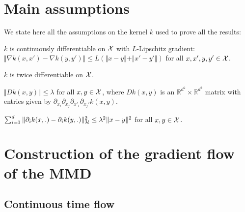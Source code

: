 \section{Main assumptions}\label{sec:assumptions_kernel}

We state here all the assumptions on the kernel $k$ used to prove all the results:%
\begin{assumplist}
	\item \label{assump:lipschitz_gradient_k} $k$ is continuously differentiable on ${{\mathcal X}}$ with $L$-Lipschitz gradient: $\Vert  \nabla k(x,x') - \nabla k(y,y')\Vert \leq L(\Vert  x-y\Vert + \Vert x'-y' \Vert ) $ for all $x,x',y,y' \in {{\mathcal X}}$.
	\item \label{assump:diff_kernel} $k$ is twice differentiable on ${{\mathcal X}}$.
	\item \label{assump:bounded_fourth_oder} $\Vert Dk(x,y) \Vert\leq \lambda  $ for all $x,y\in {{\mathcal X}}$, where $Dk(x,y)$ is an $\mathbb{R}^{d^2}\times \mathbb{R}^{d^2}$ matrix with entries given by $\partial_{x_{i}}\partial_{x_{j}}\partial_{x'_{i}}\partial_{x_{j}'}k(x,y)$.%
	\item \label{assump:Lipschitz_grad_rkhs} $ \sum_{i=1}^d\Vert  \partial_i k(x,.) - \partial_i k(y,.)\Vert^2_{{{\mathcal H}}} \leq \lambda^2 \Vert  x-y\Vert^2 $ for all $x,y\in {{\mathcal X}}$.%

\end{assumplist}

\section{Construction of the gradient flow of the MMD}\label{sec:appendix_gradient_flow}


\subsection{Continuous time flow}


%


